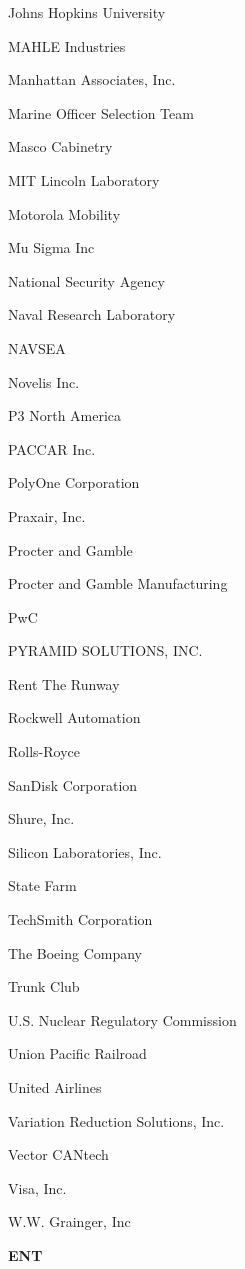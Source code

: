 \documentclass[twoside]{article}
\begin{document}
\begin{center}
\begin{multicols}{5}
\begin{FlushLeft}
\begin{compactitem}
\item Johns Hopkins University
\item MAHLE Industries
\item Manhattan Associates, Inc.
\item Marine Officer Selection Team
\item Masco Cabinetry
\item MIT Lincoln Laboratory
\item Motorola Mobility
\item Mu Sigma Inc
\item National Security Agency
\item Naval Research Laboratory
\item NAVSEA
\item Novelis Inc.
\item P3 North America
\item PACCAR Inc.
\item PolyOne Corporation
\item Praxair, Inc.
\item Procter and Gamble
\item Procter and Gamble Manufacturing
\item PwC
\item PYRAMID SOLUTIONS, INC.
\item Rent The Runway
\item Rockwell Automation
\item Rolls-Royce
\item SanDisk Corporation
\item Shure, Inc.
\item Silicon Laboratories, Inc.
\item State Farm
\item TechSmith Corporation
\item The Boeing Company
\item Trunk Club
\item U.S. Nuclear Regulatory Commission
\item Union Pacific Railroad
\item United Airlines
\item Variation Reduction Solutions, Inc.
\item Vector CANtech
\item Visa, Inc.
\item W.W. Grainger, Inc
\end{compactitem}
        \end{FlushLeft}
        \vspace{1em}
        {\fontsize{14}{16}\selectfont \bf ENT}\\

\end{multicols}
\end{center}
\end{document}
